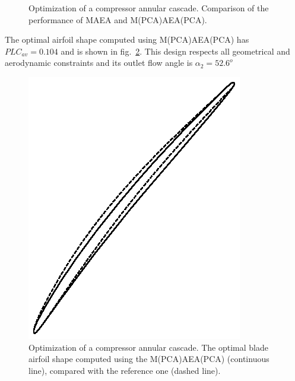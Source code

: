 \begin{figure}[h!]
\begin{minipage}[b]{1\linewidth}
 \centering
\end{minipage}
\caption{Optimization of a compressor annular cascade. Comparison of the performance of MAEA and M(PCA)AEA(PCA).} 
\label{PCAcomp}
\end{figure}




The optimal airfoil shape computed using M(PCA)AEA(PCA) has $PLC_{av}=0.104$ and is shown in fig.\ \ref{res:ntua_blade:final}. This design respects all geometrical and aerodynamic constraints and its outlet flow angle is $\alpha_2=52.6^o$   


\begin{figure}[h!]
\centering
  \includegraphics[width=.7\textwidth]{ntua_foils.eps}
  \caption{Optimization of a compressor annular cascade. The optimal blade airfoil shape computed using the M(PCA)AEA(PCA) (continuous line), compared with the reference one (dashed line).}
  \label{res:ntua_blade:final}
\end{figure}


